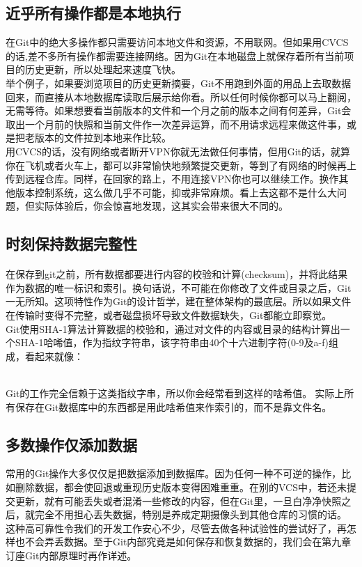 \documentclass{book}
\begin{document}
	\subsection{近乎所有操作都是本地执行}
	在Git中的绝大多操作都只需要访问本地文件和资源，不用联网。但如果用CVCS的话,差不多所有操作都需要连接网络。因为Git在本地磁盘上就保存着所有当前项目的历史更新，所以处理起来速度飞快。\\
	举个例子，如果要浏览项目的历史更新摘要，Git不用跑到外面的用品上去取数据回来，而直接从本地数据库读取后展示给你看。所以任何时候你都可以马上翻阅，无需等待。如果想要看当前版本的文件和一个月之前的版本之间有何差异，Git会取出一个月前的快照和当前文件作一次差异运算，而不用请求远程来做这件事，或是把老版本的文件拉到本地来作比较。\\
	用CVCS的话，没有网络或者断开VPN你就无法做任何事情，但用Git的话，就算你在飞机或者火车上，都可以非常愉快地频繁提交更新，等到了有网络的时候再上传到远程仓库。同样，在回家的路上，不用连接VPN你也可以继续工作。换作其他版本控制系统，这么做几乎不可能，抑或非常麻烦。看上去这都不是什么大问题，但实际体验后，你会惊喜地发现，这其实会带来很大不同的。\\
	\subsection{时刻保持数据完整性}
	\paragraph{}
	在保存到git之前，所有数据都要进行内容的校验和计算(checksum)，并将此结果作为数据的唯一标识和索引。换句话说，不可能在你修改了文件或目录之后，Git一无所知。这项特性作为Git的设计哲学，建在整体架构的最底层。所以如果文件在传输时变得不完整，或者磁盘损坏导致文件数据缺失，Git都能立即察觉。\\
	Git使用SHA-1算法计算数据的校验和，通过对文件的内容或目录的结构计算出一个SHA-1哈唏值，作为指纹字符串，该字符串由40个十六进制字符(0-9及a-f)组成，看起来就像：\\
	\begin{minipage}[c]{0.8\textwidth}
	\end{minipage}\\
	Git的工作完全信赖于这类指纹字串，所以你会经常看到这样的啥希值。实际上所有保存在Git数据库中的东西都是用此啥希值来作索引的，而不是靠文件名。\\
	\subsection{多数操作仅添加数据}
	常用的Git操作大多仅仅是把数据添加到数据库。因为任何一种不可逆的操作，比如删除数据，都会使回退或重现历史版本变得困难重重。在别的VCS中，若还未提交更新，就有可能丢失或者混淆一些修改的内容，但在Git里，一旦白净净快照之后，就完全不用担心丢失数据，特别是养成定期摄像头到其他仓库的习惯的话。\\
	这种高可靠性令我们的开发工作安心不少，尽管去做各种试验性的尝试好了，再怎样也不会弄丢数据。至于Git内部究竟是如何保存和恢复数据的，我们会在第九章订座Git内部原理时再作详述。\\
\end{document}
